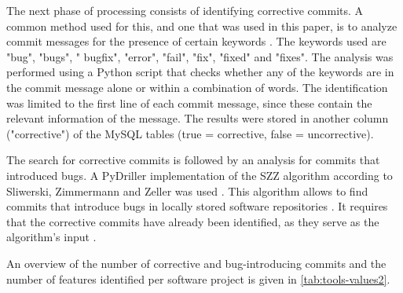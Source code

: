 The next phase of processing consists of identifying corrective commits. A common method used for this, and one that was used in this paper, is to analyze commit messages for the presence of certain keywords \cite{Zimmermann2007}. The keywords used are "bug", "bugs", " bugfix", "error", "fail", "fix", "fixed" and "fixes". The analysis was performed using a Python script that checks whether any of the keywords are in the commit message alone or within a combination of words. The identification was limited to the first line of each commit message, since these contain the relevant information of the message. The results were stored in another column ("corrective") of the MySQL tables (true = corrective, false = uncorrective).

The search for corrective commits is followed by an analysis for commits that introduced bugs. A PyDriller implementation of the SZZ algorithm according to Sliwerski, Zimmermann and Zeller was used \cite{Sliwerski2005,Spadini2018}. This algorithm allows to find commits that introduce bugs in locally stored software repositories \cite{Borg2019}. It requires that the corrective commits have already been identified, as they serve as the algorithm's input \cite{Borg2019}.

An overview of the number of corrective and bug-introducing commits and the number of features identified per software project is given in \autoref{tab:tools-values2}.

